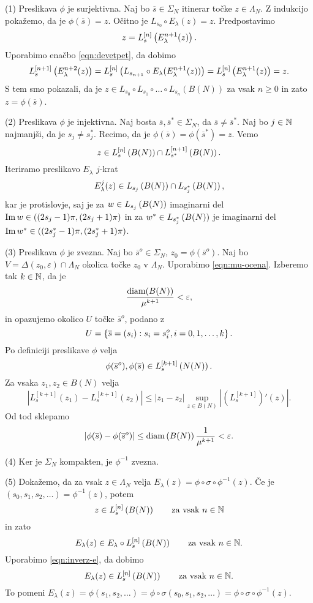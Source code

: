 \begin{dokaz}
    (1) Preslikava \(\phi\) je surjektivna. Naj bo \(\overline{s} \in \Sigma_N\) itinerar točke \(z \in \Lambda_N\). Z indukcijo pokažemo, da je \(\phi (\overline{s}) = z\). Očitno je \(L_{s_0} \circ E_\lambda (z) = z\). Predpostavimo
    \[z = L_{s}^{[n]} \left( E_{\lambda}^{n + 1} (z) \right).\]
    Uporabimo enačbo \eqref{eqn:devetpet}, da dobimo
    \[L_{s}^{[n + 1]} \left( E_{\lambda}^{n + 2} (z) \right) = L_{s}^{[n]} \left( L_{s_{n + 1}} \circ E_\lambda (E_\lambda^{n + 1} (z)) \right) = L_{s}^{[n]} \left( E_\lambda^{n + 1} (z) \right) = z.\]
    S tem smo pokazali, da je \(z \in L_{s_0} \circ L_{s_1} \circ \dots \circ L_{s_n} (B (N))\) za vsak \(n \geq 0\) in zato \(z = \phi (\overline{s})\).

    (2) Preslikava \(\phi\) je injektivna. Naj bosta \(\overline{s}, \overline{s}^* \in \Sigma_N\), da \(\overline{s} \neq \overline{s}^*\). Naj bo \(j \in \mathbb N\) najmanjši, da je \(s_j \neq s_j^*\). Recimo, da je \(\phi (\overline{s}) = \phi (\overline{s}^*) = z\). Vemo
    \[z \in L_{s}^{[n]} \left( B (N) \right) \cap L_{s^*}^{[n + 1]} \left( B (N) \right).\]
    Iteriramo preslikavo \(E_\lambda\) \(j\)-krat
    \[E_\lambda^j (z)\in L_{s_j} \left( B (N) \right) \cap L_{s_j^*} \left( B (N) \right),\]
    kar je protislovje, saj je za \(w \in L_{s_j} \left( B (N) \right)\) imaginarni del \(\operatorname{Im} w \in ((2 s_j - 1) \pi, (2 s_j + 1) \pi)\) in za \(w^* \in L_{s_j^*} \left( B (N) \right)\) je imaginarni del \(\operatorname{Im} w^* \in ((2 s_j^* - 1) \pi, (2 s_j^* + 1) \pi)\).

    (3) Preslikava \(\phi\) je zvezna. Naj bo \(\overline{s}^o \in \Sigma_N\), \(z_0 = \phi (\overline{s}^o)\). Naj bo \(V = \Delta (z_0, \varepsilon) \cap \Lambda_N\) okolica točke \(z_0\) v \(\Lambda_N\). Uporabimo \eqref{eqn:mu-ocena}. Izberemo tak \(k \in \mathbb N\), da je
    \[\frac{\operatorname{diam} (B (N))}{\mu^{k + 1}} < \varepsilon,\]
    in opazujemo okolico \(U\) točke \(\overline{s}^o\), podano z
    \[U = \left\{ \overline{s} = (s_i) : s_i = s_i^o, i = 0, 1, \dots, k \right\}.\]
    Po definiciji preslikave \(\phi\) velja
    \[\phi (\overline{s}^o), \phi (\overline{s}) \in L_s^{[k + 1]} \left( N (N) \right).\]
    Za vsaka \(z_1, z_2 \in B (N)\) velja
    \[\left| L_s^{[k + 1]} (z_1) - L_s^{[k + 1]} (z_2) \right| \leq |z_1 - z_2| \sup_{z \in B (N)} \left| (L_s^{[k + 1]})' (z) \right|.\]
    Od tod sklepamo
    \[\left| \phi (\overline{s}) - \phi (\overline{s}^o) \right| \leq \operatorname{diam} \left( B (N) \right) \frac{1}{\mu^{k + 1}} < \varepsilon.\]

    (4) Ker je \(\Sigma_N\) kompakten, je \(\phi^{-1}\) zvezna.

    (5) Dokažemo, da za vsak \(z \in \Lambda_N\) velja \(E_\lambda (z) = \phi \circ \sigma \circ \phi^{-1} (z)\). Če je \((s_0, s_1, s_2, \dots) = \phi^{-1} (z)\), potem
    \[z \in L_s^{[n]} \left( B (N) \right) \qquad \text{za vsak } n \in \mathbb N\]
    in zato
    \[E_\lambda (z) \in E_\lambda \circ L_s^{[n]} \left( B (N) \right) \qquad \text{za vsak } n \in \mathbb N.\]
    Uporabimo \eqref{eqn:inverz-e}, da dobimo
    \[E_\lambda (z) \in L_s^{[n]} \left( B (N) \right) \qquad \text{za vsak } n \in \mathbb N.\]
    To pomeni \(E_\lambda (z) = \phi (s_1, s_2, \dots) = \phi \circ \sigma (s_0, s_1, s_2, \dots) = \phi \circ \sigma \circ \phi^{-1} (z)\).
\end{dokaz}

